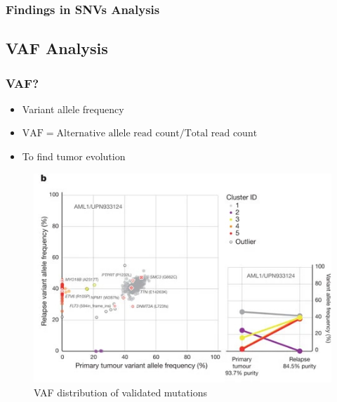 \documentclass{beamer}
\begin{document}
    \begin{frame}
        \frametitle{Findings in SNVs Analysis}
    \end{frame}

    \subsection{VAF Analysis}
    \begin{frame}
        \frametitle{VAF?}

        \begin{itemize}
            \item Variant allele frequency
            \item $\textrm{VAF} = \textrm{Alternative allele read count} / \textrm{Total read count}$
            \item To find tumor evolution
        \end{itemize}

        \begin{figure}
            \includegraphics[width=0.4 \linewidth]{figures/VAF/VAF.jpg}
            \caption{VAF distribution of validated mutations \protect\cite{VAF1}}
        \end{figure}
    \end{frame}
\end{document}
